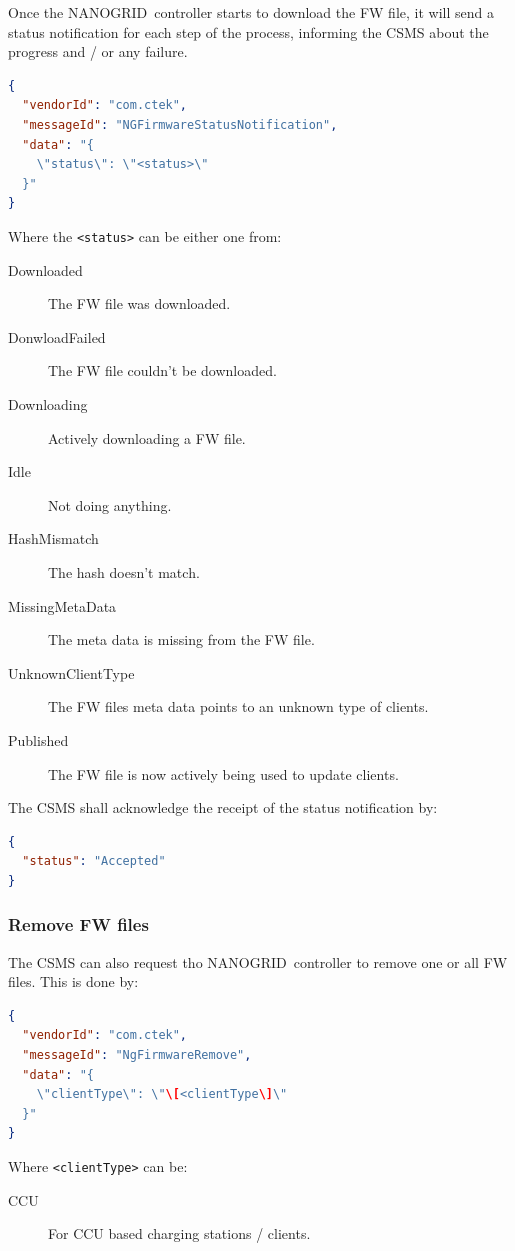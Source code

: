 \documentclass{scrartcl}
\newcommand{\nanogrid}{NANOGRID\texttrademark}
\begin{document}
Once the \nanogrid\ controller starts to download the FW file, it will send a
status notification for each step of the process, informing the CSMS about the
progress and / or any failure.
\begin{lstlisting}[language=json,caption={DataTransfer.req for reporting
the progress status of the FW file download sent from the CS},captionpos=t]
{
  "vendorId": "com.ctek",
  "messageId": "NGFirmwareStatusNotification",
  "data": "{
    \"status\": \"<status>\"
  }"
}
\end{lstlisting}
Where the \lstinline{<status>} can be either one from:
\begin{description}
\item[Downloaded] The FW file was downloaded.
\item[DonwloadFailed] The FW file couldn't be downloaded.
\item[Downloading] Actively downloading a FW file.
\item[Idle] Not doing anything.
\item[HashMismatch] The hash doesn't match.
\item[MissingMetaData] The meta data is missing from the FW file.
\item[UnknownClientType] The FW files meta data points to an unknown type of clients.
\item[Published] The FW file is now actively being used to update clients.
\end{description}

The CSMS shall acknowledge the receipt of the status notification by:
\begin{lstlisting}[language=json,caption={DataTransfer.conf for reporting the
progress status of the download of FW file download sent to the CS},captionpos=t]
{
  "status": "Accepted"
}
\end{lstlisting}

\subsubsection{Remove FW files}
\label{sec:remove-fw-files}

The CSMS can also request tho \nanogrid\ controller to remove one or all FW
files. This is done by:
\begin{lstlisting}[language=json,caption={DataTransfer.req to remove a FW
file sent to the CS},captionpos=t]
{
  "vendorId": "com.ctek",
  "messageId": "NgFirmwareRemove",
  "data": "{
    \"clientType\": \"\[<clientType\]\"
  }"
}
\end{lstlisting}
Where \lstinline{<clientType>} can be:
\begin{description}
\item[CCU] For CCU based charging stations / clients.
\end{description}
\end{document}
